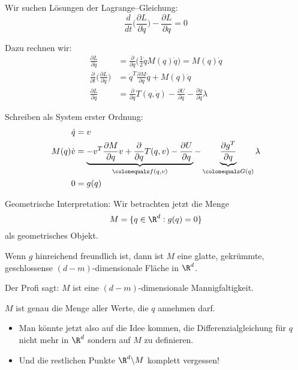 Wir suchen Lösungen der Lagrange--Gleichung:
\begin{equation*}
\frac{d}{dt}\Bigg(\frac{\partial L}{\partial \dot{q}}\Bigg) -  \frac{\partial L}{\partial q} = 0
\end{equation*}

Dazu rechnen wir:
\begin{align*}
\frac{\partial L}{\partial \dot{q}} & = \frac{\partial}{\partial \dot{q}}\Bigg( \frac{1}{2}  \dot{q} M(q) \dot{q} \Bigg) = M(q) \dot{q}
\\
\frac{\partial}{\partial t} \Bigg(\frac{\partial L}{\partial \dot{q}}\Bigg) & = \dot{q}^T\frac{\partial M}{\partial q} \dot{q} + M(q) \ddot{q}
\\
\frac{\partial L}{\partial q} & = \frac{\partial }{\partial q} T(q,\dot{q}) - \frac{\partial U}{\partial q} - \frac{\partial g}{\partial q} \lambda
\end{align*}

Schreiben als System erster Ordnung:
\begin{align*}
\dot{q} & = v
\\
M(q) \dot{v} & = \underbrace{-v^T\frac{\partial M}{\partial q} v + \frac{\partial }{\partial q} T(q,v) - \frac{\partial U}{\partial q}}_{\colonequals f(q,v)} - \underbrace{\frac{\partial g^T}{\partial q}}_{\colonequals G(q)} \lambda
\\
0 & = g(q)
\end{align*}

Geometrische Interpretation:
Wir betrachten jetzt die Menge
\begin{equation*}
M = \{q \in \R^d : g(q) = 0 \}
\end{equation*}
als geometrisches Objekt.

Wenn $g$ hinreichend freundlich ist, dann ist $M$ eine glatte, gekrümmte, geschlossense $(d-m)$-dimensionale Fläche in $\R^d$.

Der Profi sagt: $M$ ist eine $(d-m)$-dimensionale Mannigfaltigkeit.

$M$ ist genau die Menge aller Werte, die $q$ annehmen darf.

\begin{itemize}
\item Man könnte jetzt also auf die Idee kommen, die Differenzialgleichung für $q$ nicht mehr \glqq in $\R^d$\grqq{} sondern \glqq auf $M$\grqq{} zu definieren.
\item Und die restlichen Punkte $\R^d \backslash M$ komplett vergessen!
\end{itemize}

